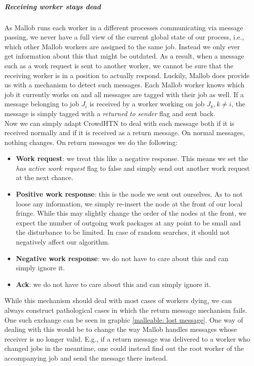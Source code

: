 \subparagraph{Receiving worker stays dead}
As Mallob runs each worker in a different processes communicating via message passing, we never have a full view of the current global state of our process, i.e., which other Mallob workers are assigned to the same job. Instead we only ever get information about this that might be outdated. As a result, when a message such as a work request is sent to another worker, we cannot be sure that the receiving worker is in a position to actually respond. Luckily, Mallob does provide us with a mechanism to detect such messages. Each Mallob worker knows which job it currently works on and all messages are tagged with their job as well. If a message belonging to job $J_i$ is received by a worker working on job $J_k, k \neq i$, the message is simply tagged with a \textit{returned to sender} flag and sent back. \\
Now we can simply adapt CrowdHTN to deal with each message both if it is received normally and if it is received as a return message. On normal messages, nothing changes. On return messages we do the following:
\begin{itemize}
	\item \textbf{Work request}: we treat this like a negative response. This means we set the \textit{has active work request} flag to false and simply send out another work request at the next chance.
	\item \textbf{Positive work response}: this is the node we sent out ourselves. As to not loose any information, we simply re-insert the node at the front of our local fringe. While this may slightly change the order of the nodes at the front, we expect the number of outgoing work packages at any point to be small and the disturbance to be limited. In case of random searches, it should not negatively affect our algorithm.
	\item \textbf{Negative work response}: we do not have to care about this and can simply ignore it.
	\item \textbf{Ack}: we do not have to care about this and can simply ignore it.
\end{itemize}
While this mechanism should deal with most cases of workers dying, we can always construct pathological cases in which the return message mechanism fails. One such exchange can be seen in graphic \ref{malleable: lost message}. One way of dealing with this would be to change the way Mallob handles messages whose receiver is no longer valid. E.g., if a return message was delivered to a worker who changed jobs in the meantime, one could instead find out the root worker of the accompanying job and send the message there instead.
